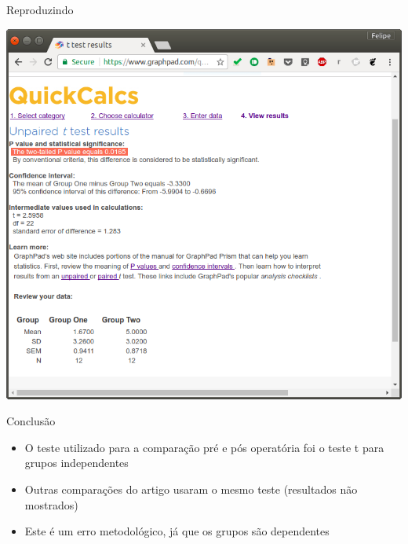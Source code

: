 \documentclass{beamer}
\begin{document}
\begin{frame}{Reproduzindo}
  \begin{center}
    \includegraphics[height=.9\textheight]{figuras/teste-t3}
  \end{center}  
\end{frame}

\begin{frame}{Conclusão}
  \begin{itemize}
  \item O teste utilizado para a comparação pré e pós operatória foi o teste t para grupos independentes
  \item Outras comparações do artigo usaram o mesmo teste (resultados não mostrados)
  \item Este é um erro metodológico, já que os grupos são dependentes
  \end{itemize}
\end{frame}

\end{document}
